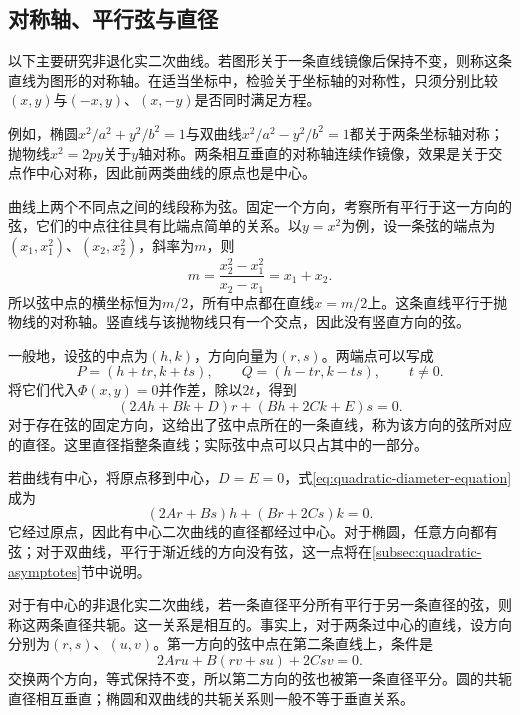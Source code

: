 \newpage
\subsection{对称轴、平行弦与直径}
\label{subsec:quadratic-axes-and-diameters}

以下主要研究非退化实二次曲线。若图形关于一条直线镜像后保持不变，则称这条直线为图形的{\heiti{}对称轴}。在适当坐标中，检验关于坐标轴的对称性，只须分别比较\((x,y)\)与\((-x,y)\)、\((x,-y)\)是否同时满足方程。

例如，椭圆\(x^2/a^2+y^2/b^2=1\)与双曲线\(x^2/a^2-y^2/b^2=1\)都关于两条坐标轴对称；抛物线\(x^2=2py\)关于\(y\)轴对称。两条相互垂直的对称轴连续作镜像，效果是关于交点作中心对称，因此前两类曲线的原点也是中心。

曲线上两个不同点之间的线段称为{\heiti{}弦}。固定一个方向，考察所有平行于这一方向的弦，它们的中点往往具有比端点简单的关系。以\(y=x^2\)为例，设一条弦的端点为\((x_1,x_1^2)\)、\((x_2,x_2^2)\)，斜率为\(m\)，则
\begin{equation*}
    m=\frac{x_2^2-x_1^2}{x_2-x_1}=x_1+x_2 .
\end{equation*}
所以弦中点的横坐标恒为\(m/2\)，所有中点都在直线\(x=m/2\)上。这条直线平行于抛物线的对称轴。竖直线与该抛物线只有一个交点，因此没有竖直方向的弦。

一般地，设弦的中点为\((h,k)\)，方向向量为\((r,s)\)。两端点可以写成
\begin{equation*}
    P=(h+tr,k+ts) , \qquad Q=(h-tr,k-ts) , \qquad t\ne0 .
\end{equation*}
将它们代入\(\Phi(x,y)=0\)并作差，除以\(2t\)，得到
\begin{equation}\label{eq:quadratic-diameter-equation}
    (2Ah+Bk+D)r+(Bh+2Ck+E)s=0 .
\end{equation}
对于存在弦的固定方向，这给出了弦中点所在的一条直线，称为该方向的弦所对应的{\heiti{}直径}。这里直径指整条直线；实际弦中点可以只占其中的一部分。

若曲线有中心，将原点移到中心，\(D=E=0\)，式\eqref{eq:quadratic-diameter-equation}成为
\begin{equation*}
    (2Ar+Bs)h+(Br+2Cs)k=0 .
\end{equation*}
它经过原点，因此有中心二次曲线的直径都经过中心。对于椭圆，任意方向都有弦；对于双曲线，平行于渐近线的方向没有弦，这一点将在\ref{subsec:quadratic-asymptotes}节中说明。

对于有中心的非退化实二次曲线，若一条直径平分所有平行于另一条直径的弦，则称这两条直径{\heiti{}共轭}。这一关系是相互的。事实上，对于两条过中心的直线，设方向分别为\((r,s)\)、\((u,v)\)。第一方向的弦中点在第二条直线上，条件是
\begin{equation}\label{eq:quadratic-conjugate-coordinate}
    2Aru+B(rv+su)+2Csv=0 .
\end{equation}
交换两个方向，等式保持不变，所以第二方向的弦也被第一条直径平分。圆的共轭直径相互垂直；椭圆和双曲线的共轭关系则一般不等于垂直关系。

